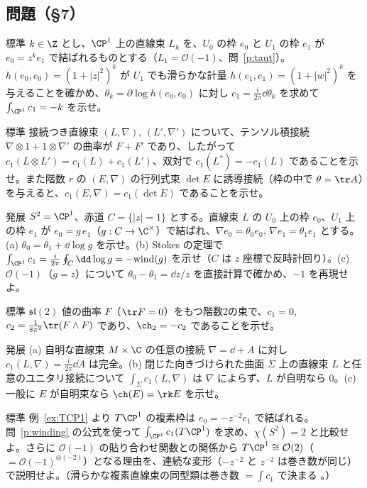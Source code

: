 \subsection*{問題（§7）}
\begin{prob}{標準}\label{p:Ok}
$k\in\Z$ とし、$\CP^1$ 上の直線束 $L_k$ を、$U_0$ の枠 $e_0$ と $U_1$ の枠 $e_1$ が $e_0=z^ke_1$ で結ばれるものとする（$L_1=\mathcal O(-1)$、問~\ref{p:taut}）。$h(e_0,e_0)=(1+|z|^2)^k$ が $U_1$ でも滑らかな計量 $h(e_1,e_1)=(1+|w|^2)^k$ を与えることを確かめ、$\theta_k=\partial\log h(e_0,e_0)$ に対し $c_1=\frac i{2\pi}\dd\theta_k$ を求めて $\int_{\CP^1}c_1=-k$ を示せ。
\end{prob}
\begin{prob}{標準}\label{p:chernops}
接続つき直線束 $(L,\nabla)$, $(L',\nabla')$ について、テンソル積接続 $\nabla\otimes1+1\otimes\nabla'$ の曲率が $F+F'$ であり、したがって $c_1(L\otimes L')=c_1(L)+c_1(L')$、双対で $c_1(L^*)=-c_1(L)$ であることを示せ。また階数 $r$ の $(E,\nabla)$ の行列式束 $\det E$ に誘導接続（枠の中で $\theta=\tr A$）を与えると、$c_1(E,\nabla)=c_1(\det E)$ であることを示せ。
\end{prob}
\begin{prob}{発展}\label{p:winding}
$S^2=\CP^1$、赤道 $C=\{|z|=1\}$ とする。直線束 $L$ の $U_0$ 上の枠 $e_0$、$U_1$ 上の枠 $e_1$ が $e_0=g\,e_1$（$g:C\to\C^\times$）で結ばれ、$\nabla e_0=\theta_0e_0$, $\nabla e_1=\theta_1e_1$ とする。(a) $\theta_0=\theta_1+\dd\log g$ を示せ。(b) Stokes の定理で $\int_{\CP^1}c_1=\frac i{2\pi}\oint_C\dd\log g=-\mathrm{wind}(g)$ を示せ（$C$ は $z$ 座標で反時計回り）。(c) $\mathcal O(-1)$（$g=z$）について $\theta_0-\theta_1=\dd z/z$ を直接計算で確かめ、$-1$ を再現せよ。
\end{prob}
\begin{prob}{標準}\label{p:c2}
$\mathfrak{sl}(2)$ 値の曲率 $F$（$\tr F=0$）をもつ階数2の束で、$c_1=0$, $c_2=\frac1{8\pi^2}\tr(F\wedge F)$ であり、$\ch_2=-c_2$ であることを示せ。
\end{prob}
\begin{prob}{発展}\label{p:trivialc1}
(a) 自明な直線束 $M\times\C$ の任意の接続 $\nabla=\dd+A$ に対し $c_1(L,\nabla)=\frac i{2\pi}\dd A$ は完全。(b) 閉じた向きづけられた曲面 $\Sigma$ 上の直線束 $L$ と任意のユニタリ接続について $\int_\Sigma c_1(L,\nabla)$ は $\nabla$ によらず、$L$ が自明なら $0$。(c) 一般に $E$ が自明束なら $\ch(E)=\rk E$ を示せ。
\end{prob}
\begin{prob}{標準}\label{p:TCP1}
例~\ref{ex:TCP1} より $T\CP^1$ の複素枠は $e_0=-z^{-2}e_1$ で結ばれる。問~\ref{p:winding} の公式を使って $\int_{\CP^1}c_1(T\CP^1)$ を求め、$\chi(S^2)=2$ と比較せよ。さらに $\mathcal O(-1)$ の貼り合わせ関数との関係から $T\CP^1\cong\mathcal O(2)$（$=\mathcal O(-1)^{\otimes(-2)}$）となる理由を、連続な変形（$-z^{-2}$ と $z^{-2}$ は巻き数が同じ）で説明せよ。（滑らかな複素直線束の同型類は巻き数 $=\int c_1$ で決まる \tC。）
\end{prob}
